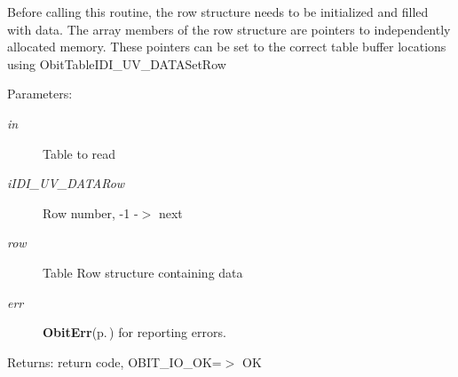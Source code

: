 Before calling this routine, the row structure needs to be initialized and filled with data. The array members of the row structure are pointers to independently allocated memory. These pointers can be set to the correct table buffer locations using Obit\-Table\-IDI\_\-UV\_\-DATASet\-Row \begin{Desc}
\item[Parameters:]
\begin{description}
\item[{\em in}]Table to read \item[{\em i\-IDI\_\-UV\_\-DATARow}]Row number, -1 -$>$ next \item[{\em row}]Table Row structure containing data \item[{\em err}]{\bf Obit\-Err}{\rm (p.\,\pageref{structObitErr})} for reporting errors. \end{description}
\end{Desc}
\begin{Desc}
\item[Returns:]return code, OBIT\_\-IO\_\-OK=$>$ OK \end{Desc}
